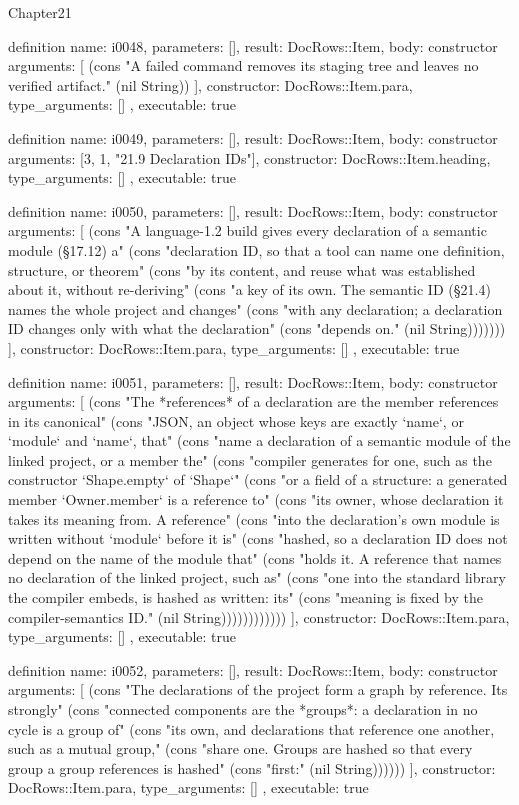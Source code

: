 \begin{lexlean}{Chapter21}
\begin{semanticmodule}
definition{
  name: i0048,
  parameters: [],
  result: DocRows::Item,
  body: constructor{
    arguments: [
      (cons "A failed command removes its staging tree and leaves no verified artifact." (nil String))
    ],
    constructor: DocRows::Item.para,
    type_arguments: []
  },
  executable: true
}

definition{
  name: i0049,
  parameters: [],
  result: DocRows::Item,
  body: constructor{
    arguments: [3, 1, "21.9 Declaration IDs"],
    constructor: DocRows::Item.heading,
    type_arguments: []
  },
  executable: true
}

definition{
  name: i0050,
  parameters: [],
  result: DocRows::Item,
  body: constructor{
    arguments: [
      (cons "A language-1.2 build gives every declaration of a semantic module (§17.12) a" (cons "declaration ID, so that a tool can name one definition, structure, or theorem" (cons "by its content, and reuse what was established about it, without re-deriving" (cons "a key of its own. The semantic ID (§21.4) names the whole project and changes" (cons "with any declaration; a declaration ID changes only with what the declaration" (cons "depends on." (nil String)))))))
    ],
    constructor: DocRows::Item.para,
    type_arguments: []
  },
  executable: true
}

definition{
  name: i0051,
  parameters: [],
  result: DocRows::Item,
  body: constructor{
    arguments: [
      (cons "The *references* of a declaration are the member references in its canonical" (cons "JSON, an object whose keys are exactly `name`, or `module` and `name`, that" (cons "name a declaration of a semantic module of the linked project, or a member the" (cons "compiler generates for one, such as the constructor `Shape.empty` of `Shape`" (cons "or a field of a structure: a generated member `Owner.member` is a reference to" (cons "its owner, whose declaration it takes its meaning from. A reference" (cons "into the declaration's own module is written without `module` before it is" (cons "hashed, so a declaration ID does not depend on the name of the module that" (cons "holds it. A reference that names no declaration of the linked project, such as" (cons "one into the standard library the compiler embeds, is hashed as written: its" (cons "meaning is fixed by the compiler-semantics ID." (nil String))))))))))))
    ],
    constructor: DocRows::Item.para,
    type_arguments: []
  },
  executable: true
}

definition{
  name: i0052,
  parameters: [],
  result: DocRows::Item,
  body: constructor{
    arguments: [
      (cons "The declarations of the project form a graph by reference. Its strongly" (cons "connected components are the *groups*: a declaration in no cycle is a group of" (cons "its own, and declarations that reference one another, such as a mutual group," (cons "share one. Groups are hashed so that every group a group references is hashed" (cons "first:" (nil String))))))
    ],
    constructor: DocRows::Item.para,
    type_arguments: []
  },
  executable: true
}


\end{semanticmodule}
\end{lexlean}
